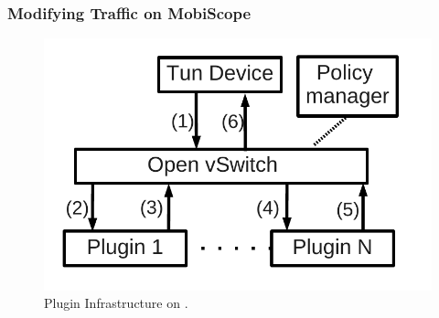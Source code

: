 
\subsubsection{Modifying Traffic on MobiScope}
\label{sec:modif-traffic-mobiscope}

\begin{figure}
\begin{center}
\includegraphics[width=0.8\columnwidth]{figures/packet-monitoring-plugin.pdf}
\end{center}
\caption{Plugin Infrastructure on \platname.}
\label{fig:packet-monitoring-solution}
\end{figure}

